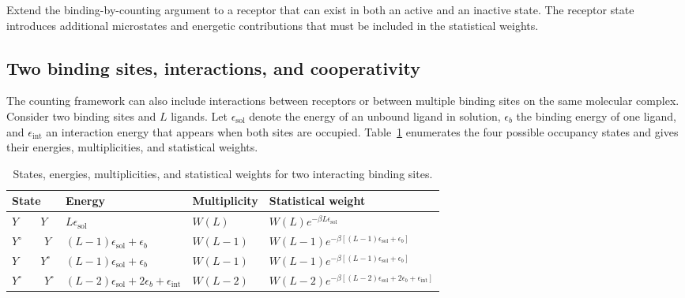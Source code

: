 Extend the binding-by-counting argument to a receptor that can exist in both an active and an inactive state.
The receptor state introduces additional microstates and energetic contributions that must be included in the statistical weights.



\subsection{Two binding sites, interactions, and cooperativity}
\label{sec:two-receptors}



The counting framework can also include interactions between receptors or between multiple binding sites on the same molecular complex.
Consider two binding sites and $L$ ligands.
Let $\epsilon_{\mathrm{sol}}$ denote the energy of an unbound ligand in solution, $\epsilon_b$ the binding energy of one ligand, and $\epsilon_{\mathrm{int}}$ an interaction energy that appears when both sites are occupied.
Table~\ref{tab:two-site-weights} enumerates the four possible occupancy states and gives their energies, multiplicities, and statistical weights.

\begin{table}[h!]
\centering
\renewcommand{\arraystretch}{1.5}
\begin{tabularx}{\textwidth}{
    |>{\centering\arraybackslash}p{2.5cm}
    |>{\raggedright\arraybackslash}X
    |>{\centering\arraybackslash}p{2.5cm}
    |>{\raggedright\arraybackslash}X|
}
\hline
\textbf{State} & \textbf{Energy} & \textbf{Multiplicity} & \textbf{Statistical weight}
\\
\hline
$Y \qquad Y$ &
$L\epsilon_{\mathrm{sol}}$ &
$W(L)$ &
$W(L)e^{-\beta L\epsilon_{\mathrm{sol}}}$
\\
\hline
$Y^{\circ} \qquad Y$ &
$(L-1)\epsilon_{\mathrm{sol}}+\epsilon_b$ &
$W(L-1)$ &
$W(L-1)e^{-\beta[(L-1)\epsilon_{\mathrm{sol}}+\epsilon_b]}$
\\
\hline
$Y \qquad Y^{\circ}$ &
$(L-1)\epsilon_{\mathrm{sol}}+\epsilon_b$ &
$W(L-1)$ &
$W(L-1)e^{-\beta[(L-1)\epsilon_{\mathrm{sol}}+\epsilon_b]}$
\\
\hline
$Y^{\circ} \qquad Y^{\circ}$ &
$(L-2)\epsilon_{\mathrm{sol}}+2\epsilon_b+\epsilon_{\mathrm{int}}$ &
$W(L-2)$ &
$W(L-2)e^{-\beta[(L-2)\epsilon_{\mathrm{sol}}+2\epsilon_b+\epsilon_{\mathrm{int}}]}$
\\
\hline
\end{tabularx}
\caption{States, energies, multiplicities, and statistical weights for two interacting binding sites.}
\label{tab:two-site-weights}
\end{table}

